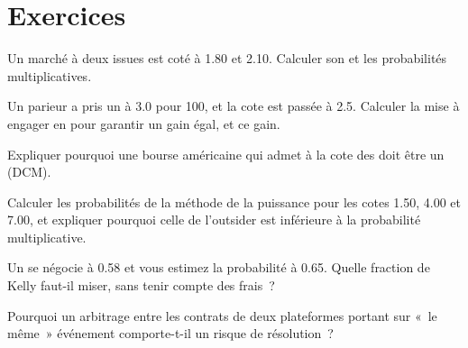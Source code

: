 \section{Exercices}

\begin{exercise}[$\star$]\label{exo:m3:prediction-and-betting-markets:1}
Un marché à deux issues est coté à 1.80 et 2.10. Calculer son  et les probabilités multiplicatives.
\end{exercise}

\begin{exercise}[$\star$]\label{exo:m3:prediction-and-betting-markets:2}
Un parieur a pris un  à 3.0 pour 100, et la cote est passée à 2.5. Calculer la mise à engager en  pour garantir un gain égal, et ce gain.
\end{exercise}

\begin{exercise}[$\star$]\label{exo:m3:prediction-and-betting-markets:3}
Expliquer pourquoi une bourse américaine qui admet à la cote des  doit être un  (DCM).
\end{exercise}

\begin{exercise}[$\star\star$]\label{exo:m3:prediction-and-betting-markets:4}
Calculer les probabilités de la méthode de la puissance pour les cotes 1.50, 4.00 et 7.00, et expliquer pourquoi celle de l'outsider est inférieure à la probabilité multiplicative.
\end{exercise}

\begin{exercise}[$\star\star$]\label{exo:m3:prediction-and-betting-markets:5}
Un  se négocie à 0.58 et vous estimez la probabilité à 0.65. Quelle fraction de Kelly faut-il miser, sans tenir compte des frais~?
\end{exercise}

\begin{exercise}[$\star\star$]\label{exo:m3:prediction-and-betting-markets:6}
Pourquoi un arbitrage entre les contrats de deux plateformes portant sur «~le même~» événement comporte-t-il un risque de résolution~?
\end{exercise}

